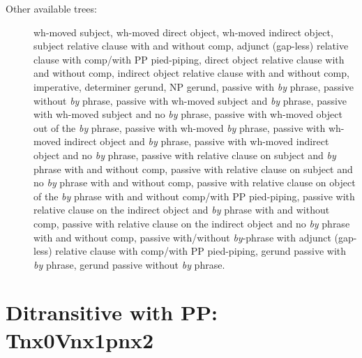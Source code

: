 \begin{description}
\item[Other available trees:] wh-moved subject, wh-moved direct object,
wh-moved indirect object, subject relative clause with and without comp, 
adjunct (gap-less) relative clause with comp/with PP pied-piping, direct object relative
clause with and without comp, indirect object relative clause with and without comp, 
imperative, determiner gerund, NP
gerund, passive with {\it by} phrase, passive without {\it by} phrase,
passive with wh-moved subject and {\it by} phrase, passive with wh-moved
subject and no {\it by} phrase, passive with wh-moved object out of the
{\it by} phrase, passive with wh-moved {\it by} phrase, passive with
wh-moved indirect object and {\it by} phrase, passive with wh-moved
indirect object and no {\it by} phrase, passive with relative clause on
subject and {\it by} phrase with and without comp, 
passive with relative clause on subject and no
{\it by} phrase with and without comp, passive with relative clause on object of the {\it by}
phrase with and without comp/with PP pied-piping, 
passive with relative clause on the indirect object and {\it by}
phrase with and without comp, passive with relative clause on the indirect object and no {\it by}
phrase with and without comp, passive with/without {\it by}-phrase with adjunct 
(gap-less) relative clause with comp/with PP pied-piping, 
gerund passive with {\it by} phrase, gerund passive without {\it by} phrase.


\end{description}





\section{Ditransitive with PP: Tnx0Vnx1pnx2}
\label{nx0Vnx1pnx2-family}

